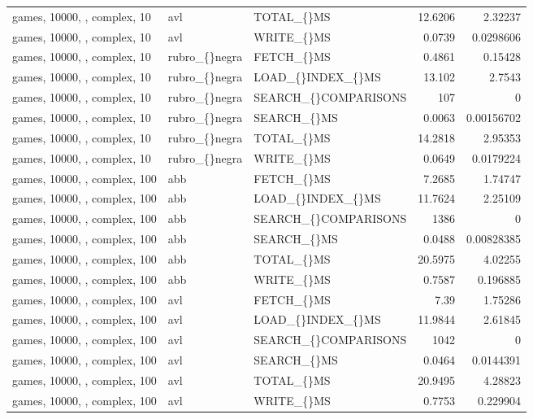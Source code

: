 \begin{longtable}{p{4cm}p{1.4cm}p{2.6cm}rr}
games, 10000, , complex, 10 & avl & TOTAL\_\allowbreak\{\}MS & 12.6206 & 2.32237\\
games, 10000, , complex, 10 & avl & WRITE\_\allowbreak\{\}MS & 0.0739 & 0.0298606\\
games, 10000, , complex, 10 & rubro\_\allowbreak\{\}negra & FETCH\_\allowbreak\{\}MS & 0.4861 & 0.15428\\
games, 10000, , complex, 10 & rubro\_\allowbreak\{\}negra & LOAD\_\allowbreak\{\}INDEX\_\allowbreak\{\}MS & 13.102 & 2.7543\\
games, 10000, , complex, 10 & rubro\_\allowbreak\{\}negra & SEARCH\_\allowbreak\{\}COMPARISONS & 107 & 0\\
games, 10000, , complex, 10 & rubro\_\allowbreak\{\}negra & SEARCH\_\allowbreak\{\}MS & 0.0063 & 0.00156702\\
games, 10000, , complex, 10 & rubro\_\allowbreak\{\}negra & TOTAL\_\allowbreak\{\}MS & 14.2818 & 2.95353\\
games, 10000, , complex, 10 & rubro\_\allowbreak\{\}negra & WRITE\_\allowbreak\{\}MS & 0.0649 & 0.0179224\\
games, 10000, , complex, 100 & abb & FETCH\_\allowbreak\{\}MS & 7.2685 & 1.74747\\
games, 10000, , complex, 100 & abb & LOAD\_\allowbreak\{\}INDEX\_\allowbreak\{\}MS & 11.7624 & 2.25109\\
games, 10000, , complex, 100 & abb & SEARCH\_\allowbreak\{\}COMPARISONS & 1386 & 0\\
games, 10000, , complex, 100 & abb & SEARCH\_\allowbreak\{\}MS & 0.0488 & 0.00828385\\
games, 10000, , complex, 100 & abb & TOTAL\_\allowbreak\{\}MS & 20.5975 & 4.02255\\
games, 10000, , complex, 100 & abb & WRITE\_\allowbreak\{\}MS & 0.7587 & 0.196885\\
games, 10000, , complex, 100 & avl & FETCH\_\allowbreak\{\}MS & 7.39 & 1.75286\\
games, 10000, , complex, 100 & avl & LOAD\_\allowbreak\{\}INDEX\_\allowbreak\{\}MS & 11.9844 & 2.61845\\
games, 10000, , complex, 100 & avl & SEARCH\_\allowbreak\{\}COMPARISONS & 1042 & 0\\
games, 10000, , complex, 100 & avl & SEARCH\_\allowbreak\{\}MS & 0.0464 & 0.0144391\\
games, 10000, , complex, 100 & avl & TOTAL\_\allowbreak\{\}MS & 20.9495 & 4.28823\\
games, 10000, , complex, 100 & avl & WRITE\_\allowbreak\{\}MS & 0.7753 & 0.229904\\

\end{longtable}
